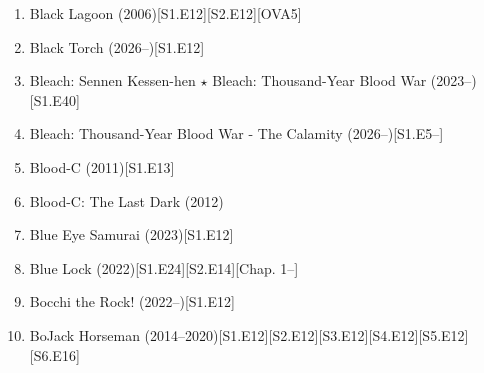 \documentclass{article}
\begin{document}
\begin{enumerate}
    Chap. 90: Mathematics \& recursion.

    Chap. 140: too horny to read.
    \item {\sc Black Lagoon} (2006)\hfill[S1.E12][S2.E12][OVA5]
    \item {\sc Black Torch} (2026--)\hfill[S1.E12]
    \item {\sc Bleach: Sennen Kessen-hen $\star$ Bleach: Thousand-Year Blood War} (2023--)\hfill[S1.E40]
    \item Bleach: Thousand-Year Blood War - The Calamity (2026--)\hfill[S1.E5--]
    \item {\sc Blood-C} (2011)\hfill[S1.E13]
    \item Blood-C: The Last Dark (2012)
    \item {\sc Blue Eye Samurai} (2023)\hfill[S1.E12]
    \item {\sc Blue Lock} (2022)\hfill[S1.E24][S2.E14][Chap. 1--]
    \item Bocchi the Rock! (2022--)\hfill[S1.E12]
    \item {\sc BoJack Horseman} (2014--2020)\hfill[S1.E12][S2.E12][S3.E12][S4.E12][S5.E12][S6.E16]


\end{enumerate}
\end{document}
